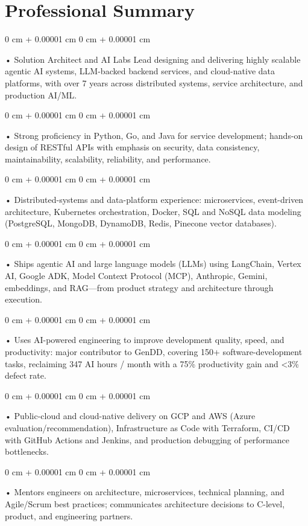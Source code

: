 \documentclass[10pt, letterpaper]{article}
\newenvironment{onecolentry}{
    \begin{adjustwidth}{
        0 cm + 0.00001 cm
    }{
        0 cm + 0.00001 cm
    }
}{
    \end{adjustwidth}
} %
\begin{document}
    \section{Professional Summary}
        \vspace{2 pt }
        \begin{onecolentry}
            • Solution Architect and AI Labs Lead designing and delivering highly scalable agentic AI systems, LLM-backed backend services, and cloud-native data platforms, with over 7 years across distributed systems, service architecture, and production AI/ML.
        \end{onecolentry}
        \begin{onecolentry}
            • Strong proficiency in Python, Go, and Java for service development; hands-on design of RESTful APIs with emphasis on security, data consistency, maintainability, scalability, reliability, and performance.
        \end{onecolentry}
        \begin{onecolentry}
            • Distributed-systems and data-platform experience: microservices, event-driven architecture, Kubernetes orchestration, Docker, SQL and NoSQL data modeling (PostgreSQL, MongoDB, DynamoDB, Redis, Pinecone vector databases).
        \end{onecolentry}
        \begin{onecolentry}
            • Ships agentic AI and large language models (LLMs) using LangChain, Vertex AI, Google ADK, Model Context Protocol (MCP), Anthropic, Gemini, embeddings, and RAG---from product strategy and architecture through execution.
        \end{onecolentry}
        \begin{onecolentry}
            • Uses AI-powered engineering to improve development quality, speed, and productivity: major contributor to GenDD, covering 150+ software-development tasks, reclaiming 347 AI hours / month with a 75\% productivity gain and <3\% defect rate.
        \end{onecolentry}
        \begin{onecolentry}
            • Public-cloud and cloud-native delivery on GCP and AWS (Azure evaluation/recommendation), Infrastructure as Code with Terraform, CI/CD with GitHub Actions and Jenkins, and production debugging of performance bottlenecks.
        \end{onecolentry}
        \begin{onecolentry}
            • Mentors engineers on architecture, microservices, technical planning, and Agile/Scrum best practices; communicates architecture decisions to C-level, product, and engineering partners.
        \end{onecolentry}
\end{document}
